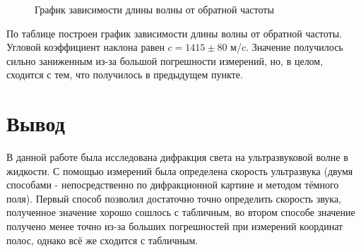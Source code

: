 \documentclass[a4paper,12pt]{article} %
\begin{document}
\begin{figure}[H]
  \caption{\centering График зависимости длины волны от обратной частоты
}
	\label{fig:image1}
\end{figure}
По таблице построен график зависимости длины волны от обратной частоты. Угловой коэффициент наклона равен $c = 1415 \pm 80$ м/c. Значение получилось сильно заниженным из-за большой погрешности измерений, но, в целом, сходится с тем, что получилось в предыдущем пункте. 
\section{Вывод}
В данной работе была исследована дифракция света на ультразвуковой волне в жидкости. С помощью измерений была определена скорость ультразвука (двумя способами - непосредственно по дифракционной картине и методом тёмного поля). Первый способ позволил достаточно точно определить скорость звука, полученное значение хорошо сошлось с табличным, во втором способе значение получено менее точно из-за больших погрешностей при измерений координат полос, однако всё же сходится с табличным. 
\end{document}
